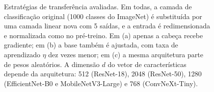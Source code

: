 \begin{figure}[t]
\caption{Estratégias de transferência avaliadas. Em todas, a camada de classificação original
(1000 classes do ImageNet) é substituída por uma camada linear nova com 5 saídas, e a entrada é
redimensionada e normalizada como no pré-treino. Em (a) apenas a cabeça recebe gradiente; em (b) a
base também é ajustada, com taxa de aprendizado $\eta$ dez vezes menor; em (c) a mesma arquitetura
parte de pesos aleatórios. A dimensão $d$ do vetor de características depende da arquitetura:
512 (ResNet-18), 2048 (ResNet-50), 1280 (EfficientNet-B0 e MobileNetV3-Large) e 768 (ConvNeXt-Tiny).}
\label{fig:modelo_proposto}
\end{figure}


